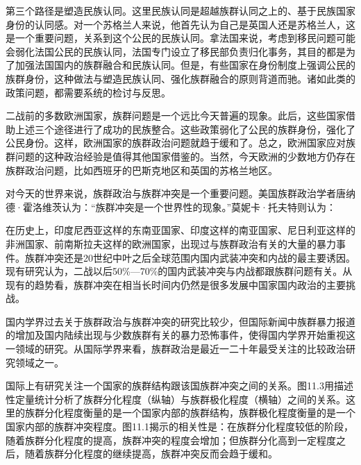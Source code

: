 第三个路径是塑造民族认同。这里民族认同是超越族群认同之上的、基于民族国家身份的认同感。对一个苏格兰人来说，他首先认为自己是英国人还是苏格兰人，这是一个重要问题，关系到这个公民的民族认同。拿法国来说，考虑到移民问题可能会弱化法国公民的民族认同，法国专门设立了移民部负责归化事务，其目的都是为了加强法国国内的族群融合和民族认同。但是，有些国家在身份制度上强调公民的族群身份，这种做法与塑造民族认同、强化族群融合的原则背道而驰。诸如此类的政策问题，都需要系统的检讨与反思。

二战前的多数欧洲国家，族群问题是一个远比今天普遍的现象。此后，这些国家借助上述三个途径进行了成功的民族整合。这些政策弱化了公民的族群身份，强化了公民身份。这样，欧洲国家的族群政治问题就趋于缓和了。总之，欧洲国家应对族群问题的这种政治经验是值得其他国家借鉴的。当然，今天欧洲的少数地方仍存在族群政治问题，比如西班牙的巴斯克地区和英国的苏格兰地区。


对今天的世界来说，族群政治与族群冲突是一个重要问题。美国族群政治学者唐纳德·霍洛维茨认为：“族群冲突是一个世界性的现象。”莫妮卡·托夫特则认为：


在历史上，印度尼西亚这样的东南亚国家、印度这样的南亚国家、尼日利亚这样的非洲国家、前南斯拉夫这样的欧洲国家，出现过与族群政治有关的大量的暴力事件。族群冲突还是20世纪中叶之后全球范围内国内武装冲突和内战的最主要诱因。现有研究认为，二战以后50\%—70\%的国内武装冲突与内战都跟族群问题有关。从现有的趋势看，族群冲突在相当长时间内仍然是很多发展中国家国内政治的主要挑战。

国内学界过去关于族群政治与族群冲突的研究比较少，但国际新闻中族群暴力报道的增加及国内陆续出现与少数族群有关的暴力恐怖事件，使得国内学界开始重视这一领域的研究。从国际学界来看，族群政治是最近一二十年最受关注的比较政治研究领域之一。

国际上有研究关注一个国家的族群结构跟该国族群冲突之间的关系。图11.3用描述性定量统计分析了族群分化程度（纵轴）与族群极化程度（横轴）之间的关系。这里的族群分化程度衡量的是一个国家内部的族群结构，族群极化程度衡量的是一个国家内部的族群冲突程度。图11.1揭示的相关性是：在族群分化程度较低的阶段，随着族群分化程度的提高，族群冲突的程度会增加；但族群分化高到一定程度之后，随着族群分化程度的继续提高，族群冲突反而会趋于缓和。

